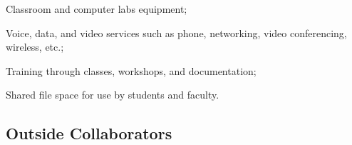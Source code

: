 \medskip 
\begin{compactitem}
  \item Classroom and computer labs equipment;
  \item Voice, data, and video services such as phone, networking, video
    conferencing, wireless, etc.; 
  \item Training through classes, workshops, and documentation;
  \item Shared file space for use by students and faculty.
  \end{compactitem}

\subsection*{Outside Collaborators}




